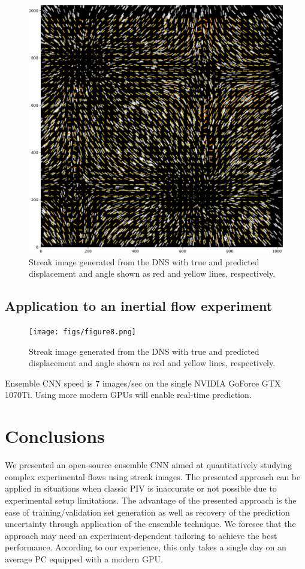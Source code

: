 \documentclass{svjour3}                     %
\begin{document}
\begin{figure}
\includegraphics[width=\textwidth]{figs/figure7.png}
\caption{Streak image generated from the DNS with true and predicted displacement and angle shown as red and yellow lines, respectively.}
\label{fig:fig8}
\end{figure}

\subsection{Application to an inertial flow experiment}

\begin{figure}
\texttt{[image: figs/figure8.png]}
\caption{Streak image generated from the DNS with true and predicted displacement and angle shown as red and yellow lines, respectively.}
\label{fig:fig9}
\end{figure}

Ensemble CNN speed is 7 images/sec on the single NVIDIA GoForce GTX 1070Ti. Using more modern GPUs will enable real-time prediction. 

\section{Conclusions}

We presented an open-source ensemble CNN aimed at quantitatively studying complex experimental flows using streak images. The presented approach can be applied in situations when classic PIV is inaccurate or not possible due to experimental setup limitations. The advantage of the presented approach is the ease of training/validation set generation as well as recovery of the prediction uncertainty through application of the ensemble technique. We foresee that the approach may need an experiment-dependent tailoring to achieve the best performance. According to our experience, this only takes a single day on an average PC equipped with a modern GPU.
\end{document}
